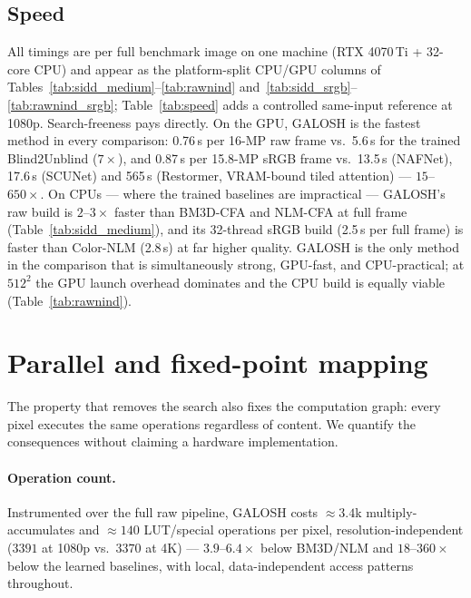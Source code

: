 \documentclass[10pt,twocolumn]{article}
\begin{document}
\subsection{Speed}\label{sec:speed}
All timings are per full benchmark image on one machine (RTX 4070\,Ti +
32-core CPU) and appear as the platform-split CPU/GPU columns of
Tables~\ref{tab:sidd_medium}--\ref{tab:rawnind}
and~\ref{tab:sidd_srgb}--\ref{tab:rawnind_srgb};
Table~\ref{tab:speed} adds a controlled same-input reference at 1080p.
Search-freeness pays directly. On the GPU, GALOSH is the fastest method in
every comparison: 0.76\,s per 16-MP raw frame vs.\ 5.6\,s for the trained
Blind2Unblind ($7\times$), and 0.87\,s per 15.8-MP sRGB frame vs.\ 13.5\,s
(NAFNet), 17.6\,s (SCUNet) and 565\,s (Restormer, VRAM-bound tiled attention)
--- $15$--$650\times$. On CPUs --- where the trained baselines are
impractical --- GALOSH's raw build is $2$--$3\times$ faster than BM3D-CFA and
NLM-CFA at full frame (Table~\ref{tab:sidd_medium}), and its 32-thread sRGB
build (2.5\,s per full frame) is faster than Color-NLM (2.8\,s) at far higher
quality. GALOSH is the
only method in the comparison that is simultaneously strong, GPU-fast, and
CPU-practical; at $512^2$ the GPU launch overhead dominates and the CPU build
is equally viable (Table~\ref{tab:rawnind}).

\section{Parallel and fixed-point mapping}\label{sec:map}
The property that removes the search also fixes the computation graph: every
pixel executes the same operations regardless of content. We quantify the
consequences without claiming a hardware implementation.

\paragraph{Operation count.} Instrumented over the full raw pipeline, GALOSH
costs $\approx\!3.4$k multiply-accumulates and $\approx\!140$ LUT/special
operations per pixel, resolution-independent ($3391$ at 1080p vs.\ $3370$ at
4K) --- $3.9$--$6.4\times$ below BM3D/NLM and $18$--$360\times$ below the
learned baselines, with local, data-independent access patterns throughout.
\end{document}

